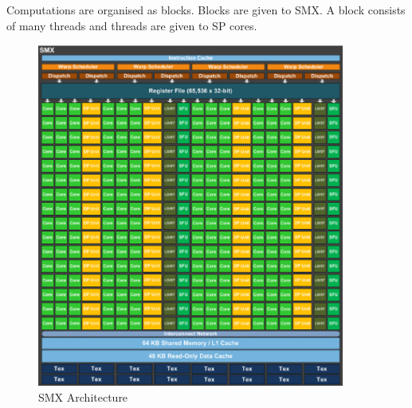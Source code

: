 \documentclass[12pt]{article}
\begin{document}
Computations are organised as blocks. Blocks are given to SMX. A block consists of many threads and threads are given to SP cores.
\begin{figure}[H]
    \centering
    \includegraphics[width=0.9\textwidth]{images/smx.png}
    \caption{SMX Architecture}
    \label{fig:smx}
\end{figure}
\end{document}
